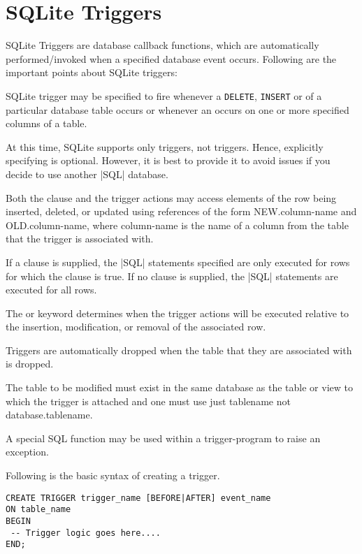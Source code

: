 

\chapter{SQLite Triggers}

SQLite Triggers are database callback functions, which are automatically performed/invoked when a specified database event occurs. Following are the important points about SQLite triggers: 

SQLite trigger may be specified to fire whenever a \texttt{DELETE}, \texttt{INSERT} or 
 of a particular database table occurs or whenever an 
 occurs on one or more specified columns of a table.

At this time, SQLite supports only  triggers, not  triggers. Hence, explicitly specifying  is optional. However, it is best to provide it to avoid issues if you decide to use another |SQL| database. 

Both the  clause and the trigger actions may access elements of the row being inserted, deleted, or updated using references of the form NEW.column-name and OLD.column-name, where column-name is the name of a column from the table that the trigger is associated with.

If a  clause is supplied, the |SQL| statements specified are only executed for rows for which the  clause is true. If no  clause is supplied, the |SQL| statements are executed for all rows.

The  or  keyword determines when the trigger actions will be executed relative to the insertion, modification, or removal of the associated row.

Triggers are automatically dropped when the table that they are associated with is dropped.

The table to be modified must exist in the same database as the table or view to which the trigger is attached and one must use just tablename not database.tablename.

A special SQL function  may be used within a trigger-program to raise an exception.


Following is the basic syntax of creating a trigger.

\begin{verbatim}
CREATE TRIGGER trigger_name [BEFORE|AFTER] event_name 
ON table_name
BEGIN
 -- Trigger logic goes here....
END;
\end{verbatim}



